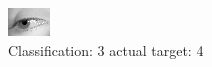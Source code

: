 \begin{figure}[h!]
\begin{center}
\includegraphics[width=0.60\columnwidth]{figures/ID2965_class_3_target_4.png}
\end{center}
\caption{ Classification: 3 actual target: 4}
\label{fig:ID2965_class_3_target_4}
\end{figure}
